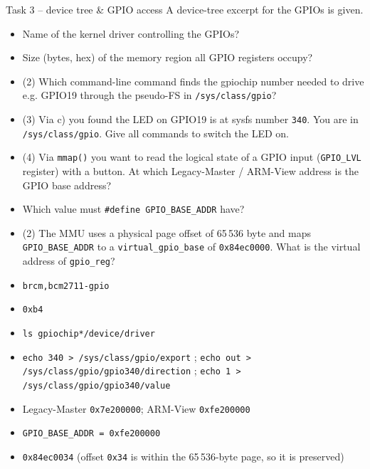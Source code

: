 \begin{example2}{Task 3 -- device tree \& GPIO access}
    A device-tree excerpt for the GPIOs is given.
    \begin{itemize}
        \item {} Name of the kernel driver controlling the GPIOs?
        \item {} Size (bytes, hex) of the memory region all GPIO registers occupy?
        \item {} (2) Which command-line command finds the gpiochip number
              needed to drive e.g. GPIO19 through the pseudo-FS in \texttt{/sys/class/gpio}?
        \item {} (3) Via c) you found the LED on GPIO19 is at sysfs number
              \texttt{340}. You are in \texttt{/sys/class/gpio}. Give all commands to
              switch the LED on.
        \item {} (4) Via \texttt{mmap()} you want to read the logical state
              of a GPIO input (\texttt{GPIO\_LVL} register) with a button. At which
              Legacy-Master / ARM-View address is the GPIO base address?
        \item {} Which value must \texttt{\#define GPIO\_BASE\_ADDR} have?
        \item {} (2) The MMU uses a physical page offset of 65\,536 byte and
              maps \texttt{GPIO\_BASE\_ADDR} to a \texttt{virtual\_gpio\_base} of
              \texttt{0x84ec0000}. What is the virtual address of \texttt{gpio\_reg}?
    \end{itemize}
    \tcblower
    \begin{itemize}
        \item {} \texttt{brcm,bcm2711-gpio}
        \item {} \texttt{0xb4}
        \item {} \texttt{ls gpiochip*/device/driver}
        \item {} \texttt{echo 340 > /sys/class/gpio/export} ;
              \texttt{echo out > /sys/class/gpio/gpio340/direction} ;
              \texttt{echo 1 > /sys/class/gpio/gpio340/value}
        \item {} Legacy-Master \texttt{0x7e200000}; ARM-View \texttt{0xfe200000}
        \item {} \texttt{GPIO\_BASE\_ADDR = 0xfe200000}
        \item {} \texttt{0x84ec0034} (offset \texttt{0x34} is within the
              65\,536-byte page, so it is preserved)
    \end{itemize}
\end{example2}

